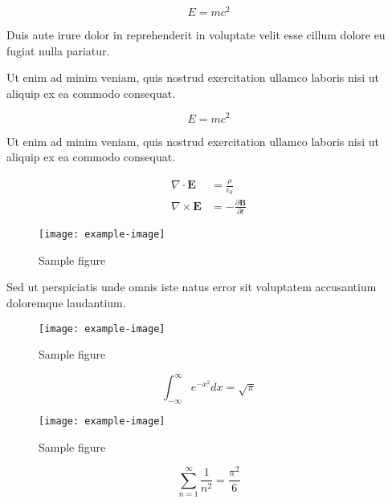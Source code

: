 \documentclass{article}
\begin{document}
\begin{equation}
    E = mc^2
\end{equation}

Duis aute irure dolor in reprehenderit in voluptate velit esse cillum dolore eu fugiat nulla pariatur.


Ut enim ad minim veniam, quis nostrud exercitation ullamco laboris nisi ut aliquip ex ea commodo consequat.

\begin{equation}
    E = mc^2
\end{equation}

Ut enim ad minim veniam, quis nostrud exercitation ullamco laboris nisi ut aliquip ex ea commodo consequat.


\begin{align}
    \nabla \cdot \mathbf{E} &= \frac{\rho}{\epsilon_0} \\
    \nabla \times \mathbf{E} &= -\frac{\partial \mathbf{B}}{\partial t}
\end{align}

\begin{figure}[h]
    \centering
    \texttt{[image: example-image]}
    \caption{Sample figure}
    \label{fig:sample}
\end{figure}

Sed ut perspiciatis unde omnis iste natus error sit voluptatem accusantium doloremque laudantium.

\begin{figure}[h]
    \centering
    \texttt{[image: example-image]}
    \caption{Sample figure}
    \label{fig:sample}
\end{figure}

\begin{equation}
    \int_{-\infty}^{\infty} e^{-x^2} dx = \sqrt{\pi}
\end{equation}


\begin{figure}[h]
    \centering
    \texttt{[image: example-image]}
    \caption{Sample figure}
    \label{fig:sample}
\end{figure}


\begin{equation}
    \sum_{n=1}^{\infty} \frac{1}{n^2} = \frac{\pi^2}{6}
\end{equation}
\end{document}
